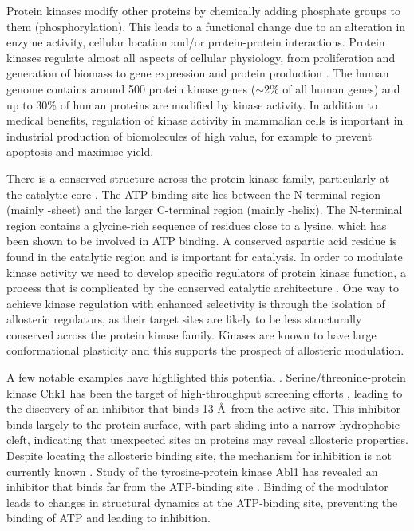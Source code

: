 Protein kinases modify other proteins by chemically adding phosphate groups to them (phosphorylation).
This leads to a functional change due to an alteration in enzyme activity, cellular location and/or protein-protein interactions.
Protein kinases regulate almost all aspects of cellular physiology, from proliferation and generation of biomass to gene expression and protein production \cite{Manning2002}.
The human genome contains around 500 protein kinase genes ($\sim$2\% of all human genes) and up to 30\% of human proteins are modified by kinase activity.
In addition to medical benefits, regulation of kinase activity in mammalian cells is important in industrial production of biomolecules of high value, for example to prevent apoptosis and maximise yield.

There is a conserved structure across the protein kinase family, particularly at the catalytic core \cite{Endicott2012}.
The ATP-binding site lies between the N-terminal region (mainly \textbeta -sheet) and the larger C-terminal region (mainly \textalpha -helix).
The N-terminal region contains a glycine-rich sequence of residues close to a lysine, which has been shown to be involved in ATP binding.
A conserved aspartic acid residue is found in the catalytic region and is important for catalysis.
In order to modulate kinase activity we need to develop specific regulators of protein kinase function, a process that is complicated by the conserved catalytic architecture \cite{Muller2015, Norman2012}.
One way to achieve kinase regulation with enhanced selectivity is through the isolation of allosteric regulators, as their target sites are likely to be less structurally conserved across the protein kinase family.
Kinases are known to have large conformational plasticity \cite{Kornev2015, Huse2002} and this supports the prospect of allosteric modulation.

A few notable examples have highlighted this potential \cite{DeSmet2014, Gavrin2013}.
Serine/threonine-protein kinase Chk1 has been the target of high-throughput screening efforts \cite{Converso2009}, leading to the discovery of an inhibitor that binds 13 \AA\ from the active site.
This inhibitor binds largely to the protein surface, with part sliding into a narrow hydrophobic cleft, indicating that unexpected sites on proteins may reveal allosteric properties.
Despite locating the allosteric binding site, the mechanism for inhibition is not currently known \cite{Vanderpool2009}.
Study of the tyrosine-protein kinase Abl1 has revealed an inhibitor that binds far from the ATP-binding site \cite{Zhang2010, Yang2011}.
Binding of the modulator leads to changes in structural dynamics at the ATP-binding site, preventing the binding of ATP and leading to inhibition.

